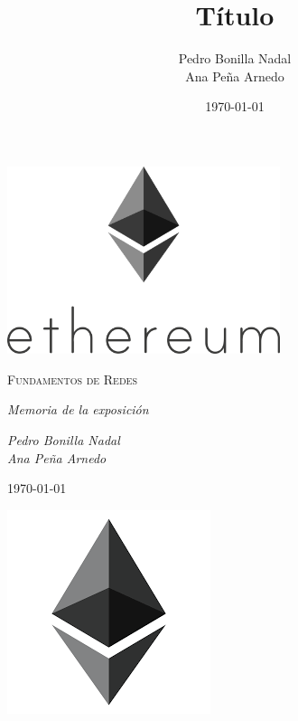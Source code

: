 \documentclass[11pt,a4paper]{article}
\title{Título}
\author{Pedro Bonilla Nadal\\Ana Peña Arnedo}
\date{\today}
\begin{document}
\begin{titlepage}
  \centering
  
  \vspace{10cm}
  \includegraphics[width=0.6\textwidth]{images/portada.png}\par\vspace{1cm}
                  {\scshape\large Fundamentos de Redes \par} \vspace{1cm}
                  \vspace{0.4cm}
                         {\large\itshape Memoria de la exposición\\}
                         \vspace{0.6cm}
                                {\large\itshape  Pedro Bonilla Nadal\\Ana Peña Arnedo \par} \vspace{1.00cm}

                                \vfill
                                    {\large \today\par}

\end{titlepage}
\begin{center}
  \includegraphics[scale=.42]{images/logo.png}
\end{center}
\end{document}
